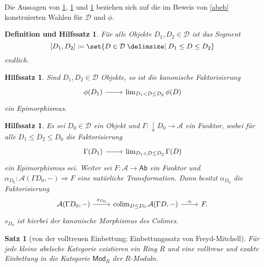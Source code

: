 \documentclass[a4paper, parskip=half]{scrartcl}
\theoremstyle{marginbreak}
\newtheorem{theorem}[remark]{Satz}
\newtheorem{lemma}[remark]{Hilfssatz}
\newtheorem{defle}[remark]{Definition und Hilfssatz}
\theoremstyle{nonumberplain}
\newcommand\ccat\mathsf
\newcommand\cat\mathcal
\newcommand{\down}[1]{{\downarrow}#1}
\DeclareMathOperator{\colim}{colim}
\begin{document}
		Die Aussagen von \ref{fin}, \ref{fact} und \ref{func} beziehen sich auf
		die im Beweis von \ref{abeb} konstruierten
		Wahlen für $\cat{D}$ und $\phi$.
		\begin{defle}\label{fin}
			Für alle Objekte $D_1,D_2\in\cat{D}$ ist das Segment
				\[
					[D_1, D_2] \coloneqq\set{D\in\cat{D}\given D_1\leq D\leq D_2}
				\]
			endlich.
		\end{defle}
		\begin{lemma}\label{fact}
			Sind $D_1, D_2\in\cat{D}$ Objekte, so ist die kanonische Faktorisierung
			\[
				\begin{tikzcd}
					\phi(D_1) \arrow[r] & \lim_{D_1<D\leq D_2}\phi(D)
				\end{tikzcd}
			\]
			ein Epimorphismus.
		\end{lemma}
		\begin{lemma}\label{func}
			Es sei $D_0\in\cat{D}$ ein Objekt und $\Gamma\colon \down{D_0}\to\cat{A}$
			ein Funktor, wobei für alle $D_1\leq D_2\leq D_0$ die Faktorisierung
			\[
				\begin{tikzcd}
					\Gamma(D_1) \arrow[r] & \lim_{D_1<D\leq D_2} \Gamma(D)
				\end{tikzcd}
			\]
			ein Epimorphismus sei. Weiter sei $F\colon\cat{A}\to\ccat{Ab}$ ein
			Funktor und $\alpha_{D_0}\colon \cat{A}(\Gamma D_0, {-})\Rightarrow F$
			eine natürliche Transformation. Dann besitzt $\alpha_{D_0}$ die
			Faktorisierung
			\[
				\begin{tikzcd}
					\cat{A}(\Gamma D_0, {-}) \arrow{r}{s_{D_0}} & \colim_{D\leq D_0}\cat{A}(\Gamma D, {-}) \arrow{r}{\alpha} & F.
				\end{tikzcd}
			\]
			$s_{D_0}$ ist hierbei der kanonische Morphismus des Colimes.
		\end{lemma}
		\begin{theorem}[von der volltreuen Einbettung; Einbettungssatz von Freyd-Mitchell]
			Für jede kleine abelsche Kategorie existieren ein Ring $R$ und eine volltreue
			und exakte Einbettung in die Kategorie $\ccat{Mod}_R$ der $R$-Moduln.
		\end{theorem}
\end{document}
